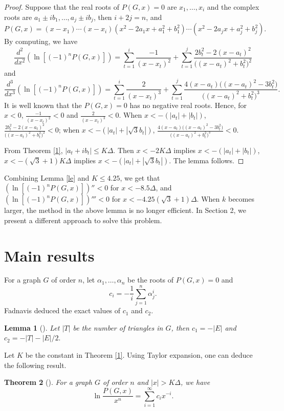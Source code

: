 \documentclass[12pt]{article}
\newtheorem{theorem}{Theorem}[section]
\newtheorem{lemma}[theorem]{Lemma}
\theoremstyle{definition}
\begin{document}
\begin{proof} Suppose that the real roots of $P(G,x)=0$ are $x_1,\ldots,x_i$ and the complex roots are $a_1\pm ib_1,\ldots, a_j\pm ib_j$, then $i+2j=n$, and
$$P(G,x)=(x-x_1)\cdots(x-x_i)(x^2-2a_1x+a_1^2+b_1^2)\cdots(x^2-2a_jx+a_j^2+b_j^2).$$
By computing, we have \[
\frac{d^2}{dx^2} (\ln[(-1)^n P(G, x)])=\sum_{t=1}^i\frac{-1}{(x-x_t)^2}+\sum_{t=1}^j\frac{2b_t^2-2(x-a_t)^2}{\big((x-a_t)^2+b_t^2\big)^2}
\]
and
\[
\frac{d^3}{dx^3} (\ln[(-1)^n P(G, x)])=\sum_{t=1}^i\frac{2}{(x-x_t)^3}+\sum_{t=1}^j\frac{4(x-a_t)\big((x-a_t)^2-3b_t^2\big)}{\big((x-a_t)^2+b_t^2\big)^3}.
\]
It is well known that the $P(G,x)=0$ has no negative real roots. Hence, for $x<0$, $\frac{-1}{(x-x_t)^2}<0$ and $\frac{2}{(x-x_t)^3}<0$.
When $x<-(|a_t|+|b_t|)$, $\frac{2b_t^2-2(x-a_t)^2}{\big((x-a_t)^2+b_t^2\big)^2}<0$; when $x<-(|a_t|+|\sqrt{3}b_t|)$, $\frac{4(x-a_t)\big((x-a_t)^2-3b_t^2\big)}{\big((x-a_t)^2+b_t^2\big)^3}<0$.

From Theorem \ref{1}, $|a_t+ib_t|\leq K\Delta$.  Then \( x <-2K\Delta\) implies $x<-(|a_t|+|b_t|)$,  \( x <-(\sqrt{3}+1)K\Delta\) implies $x<-(|a_t|+|\sqrt{3}b_t|)$. The lemma follows.
\end{proof}

Combining Lemma \ref{le} and $K\leq 4.25$, we get that $(\ln[(-1)^n P(G, x)])'' < 0$ for $x<-8.5\Delta$, and $(\ln[(-1)^n P(G, x)])''' < 0$ for $x<-4.25(\sqrt{3}+1)\Delta$.
When $k$ becomes larger, the method in the above lemma is no longer efficient. In Section 2, we present a different approach to solve this problem.



\section{Main results}
For a graph $G$ of order $n$, let $\alpha_1,\ldots, \alpha_n$ be the roots of $P(G,x)=0$ and \[
c_i=-\dfrac{1}{i}\sum\limits_{j=1}^n \alpha_j^i.
\]
Fadnavis \cite{F15} deduced the exact values of $c_1$ and $c_2$.
\begin{lemma} [\cite{F15}] \label{4} Let $|T|$ be the number of triangles in $G$, then $c_1=-|E|$ and $c_2=-|T|-|E|/2.$
\end{lemma}


Let $K$ be the constant in Theorem \ref{1}. Using Taylor expansion, one can deduce the following result.
\begin{theorem} [\cite{F15}]\label{3} For a graph $G$ of order $n$ and $|x|>K\Delta$, we have
\[
\ln \frac{P(G,x)}{x^n} = \sum_{i=1}^\infty c_i x^{-i}.
\]
\end{theorem}
\end{document}
